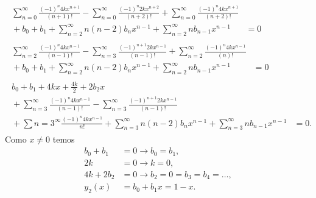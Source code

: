 \documentclass[a4paper,12pt, leqno, answers]{exam}
\begin{document}
\begin{questions}
\begin{solution}
\begin{align*}
            \begin{split}
                \sum_{n = 0}^\infty \frac{\left( -1 \right)^n 4 k x^{n + 1}}{\left( n + 1 \right)!} - \sum_{n = 0}^\infty \frac{\left( -1 \right)^n 2 k x^{n + 2}}{\left( n + 2 \right)!} + \sum_{n = 0}^\infty \frac{\left( -1 \right)^n 4 k x^{n + 1}}{\left( n + 2 \right)!} \\ {}+ b_0 + b_1 + \sum_{n = 2}^\infty n \left( n - 2 \right) b_n x^{n - 1} + \sum_{n = 2}^\infty n b_{n - 1} x^{n - 1} &= 0
            \end{split} \\
            \begin{split}
                \sum_{n = 2}^\infty \frac{\left( -1 \right)^n 4 k x^{n - 1}}{\left( n - 1 \right)!} - \sum_{n = 3}^\infty \frac{\left( -1 \right)^{n + 1} 2 k x^{n - 1}}{\left( n - 1 \right)!} + \sum_{n = 2}^\infty \frac{\left( -1 \right)^n 4 k x^{n - 1}}{\left( n \right)!} \\ {}+ b_0 + b_1 + \sum_{n = 2}^\infty n \left( n - 2 \right) b_n x^{n - 1} + \sum_{n = 2}^\infty n b_{n - 1} x^{n - 1} &= 0
            \end{split} \\
            \begin{split}
                b_0 + b_1 + 4 k x + \frac{4 k }{2} + 2 b_2 x \\ {}+ \sum_{n = 3}^\infty \frac{\left( -1 \right)^n 4 k x^{n - 1}}{\left( n - 1 \right)!} - \sum_{n = 3}^\infty \frac{\left( -1 \right)^{n + 1} 2 k x^{n -1}}{\left( n - 1 \right)!} \\ {}+ \sum{n = 3}^\infty \frac{\left( -1 \right)^n 4 k x^{n - 1}}{n!} + \sum_{n = 3}^\infty n \left( n - 2 \right) b_n x^{n - 1} + \sum_{n = 3}^\infty n b_{n - 1} x^{n - 1} &= 0.
            \end{split}
        \end{align*}
        Como $x \neq 0$ temos
        \begin{align*}
            b_0 + b_1 &= 0 \rightarrow b_0 = b_1, \\
            2 k &= 0 \rightarrow k = 0, \\
            4 k + 2 b_2 &= 0 \rightarrow b_2 = 0 = b_3 = b_4 = \ldots, \\
            y_2(x) &= b_0 + b_1 x = 1 - x.
        \end{align*}
    \end{solution}

    \question[T2 de 2011]
    \begin{solution}
        

\end{solution}
\end{questions}
\end{document}
